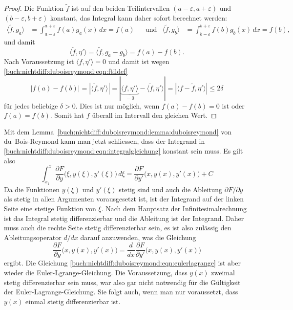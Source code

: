 \begin{proof}
Die Funktion $\tilde{f}$ ist auf den beiden Teilintervallen
$(a-\varepsilon,a+\varepsilon)$ und $(b-\varepsilon,b+\varepsilon)$
konstant, das Integral kann daher sofort berechnet werden:
\begin{align*}
\langle \tilde{f},g_a\rangle
&=
\int_{a-\varepsilon}^{a+\varepsilon}
f(a) g_a(x)
\,dx
=
f(a)
&&\text{und}&
\langle \tilde{f},g_b\rangle
&=
\int_{b-\varepsilon}^{b+\varepsilon}
f(b) g_b(x)
\,dx
=
f(b),
\end{align*}
und damit
\[
\langle \tilde{f},\eta'\rangle
=
\langle \tilde{f},g_a-g_b\rangle
=
f(a)-f(b).
\]
Nach Voraussetzung ist $\langle f,\eta'\rangle=0$ und damit ist
wegen \eqref{buch:nichtdiff:duboisreymond:eqn:ftildef}
\[
|f(a)-f(b)|
=
|\langle\tilde{f},\eta'\rangle|
=
|
\underbrace{\langle f,\eta'\rangle}_{\displaystyle =0}
-
\langle \tilde{f},\eta'\rangle
|
=
|\langle f-\tilde{f},\eta'\rangle|
\le
2\delta
\]
für jedes beliebige $\delta > 0$.
Dies ist nur möglich, wenn $f(a)-f(b)=0$ ist oder $f(a)=f(b)$.
Somit hat $f$ überall im Intervall den gleichen Wert.
\end{proof}

Mit dem Lemma~\ref{buch:nichtdiff:duboisreymond:lemma:duboisreymond}
von du~Bois-Reymond kann man jetzt schliessen, dass der Integrand in
\eqref{buch:nichtdiff:duboisreymond:eqn:integralgleichung}
konstant sein muss.
Es gilt also
\begin{equation}
\int_{x_1}^x\frac{\partial F}{\partial y}\bigl(\xi, y(\xi),y'(\xi)\bigr)
\,d\xi
=
\frac{\partial F}{\partial y'}\bigl(x,y(x),y'(x)\bigr)
+
C
\label{buch:nichtdiff:duboisreymond:gleichung}
\end{equation}
Da die Funktionen $y(\xi)$ und $y'(\xi)$ stetig sind und auch
die Ableitung $\partial F/\partial y$ als stetig in allen Argumenten
vorausgesetzt ist, ist der Integrand auf der linken Seite eine
stetige Funktion von $\xi$.
Nach dem Hauptsatz der Infinitesimalrechnung ist das Integral
stetig differenzierbar und die Ableitung ist der Integrand.
Daher muss auch die rechte Seite stetig differenzierbar sein,
es ist also zulässig den Ableitungsoperator $d/dx$ darauf anzuwenden,
was die Gleichung
\begin{equation}
\frac{\partial F}{\partial y}\bigl(x,y(x),y'(x)\bigr)
=
\frac{d}{dx}
\frac{\partial F}{\partial y'}\bigl(x,y(x),y'(x)\bigr)
\label{buch:nichtdiff:duboisreymond:eqn:eulerlagrange}
\end{equation}
ergibt.
Die Gleichung
\eqref{buch:nichtdiff:duboisreymond:eqn:eulerlagrange}
ist aber wieder die Euler-Lgrange-Gleichung.
Die Voraussetzung, dass $y(x)$ zweimal stetig differenzierbar sein
muss, war also gar nicht notwendig für die Gültigkeit der
Euler-Lagrange-Gleichung.
Sie folgt auch, wenn man nur voraussetzt, dass $y(x)$ einmal stetig
differenzierbar ist.

